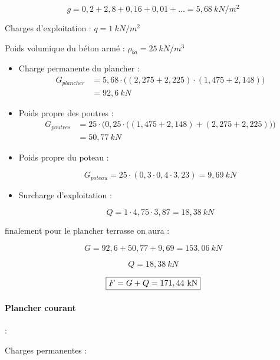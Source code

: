\documentclass[12pt,a4paper]{article}
\begin{document}
	\[ g = 0,2+2,8+0,16+0,01+... = 5,68~\unit{kN\per m^{2}} \]
	
		
	Charges d'exploitation : $q = 1~\unit{kN\per m^{2}}$
	
	
	Poids volumique du béton armé : $\rho_{ba} = 25~\unit{kN\per m^{3}}$
	
	\vspace{2\baselineskip}
	
	
	
	\begin{itemize}
		\item Charge permanente du plancher :
		\[
		\begin{aligned}
			G_{plancher} &= 5,68 \cdot  \bigg( (2,275 + 2,225) \cdot (1,475 + 2,148) \bigg) \\
			&=92,6~\unit{kN}
		\end{aligned}
		\]
		
		\item Poids propre des poutres : 
		\[
		\begin{aligned}
			G_{poutres} &= 25 \cdot \bigg( 0,25 \cdot \bigg( (1,475+2,148) + (2,275 + 2,225) \bigg) \bigg) \\
			&= 50,77~\unit{kN}
		\end{aligned}
		\]
		
		\item Poids propre du poteau :
		
		\[
		G_{poteau} = 25 \cdot (0,3 \cdot 0,4 \cdot 3,23) = 9,69~\unit{kN}
		\]
		
		\item Surcharge d'exploitation : 
		
		\[ Q = 1 \cdot 4,75 \cdot 3,87 = 18,38~\unit{kN} \]
	\end{itemize}
	
	
	
	
	finalement pour le plancher terrasse on aura : 
	
	\[ G = 92,6 + 50,77 + 9,69 = 153,06~\unit{kN} \]
	
	\[ Q = 18,38~\unit{kN} \]
	
	\[ \fbox{$F = G + Q = 171,44~\unit{kN} $}\]
	
	
	
	
	
	
	\paragraph{Plancher courant} :
	
	Charges permanentes :
	
\end{document}
